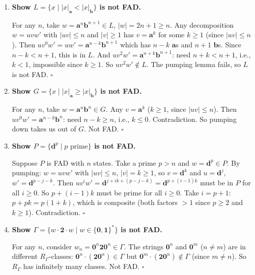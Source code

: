 \begin{enumerate}[{2.}1.]
\item \textbf{Show $L=\{x\mid|x|_\mathbf{a}<|x|_\mathbf{b}\}$ is not FAD.}

For any $n$, take $w=\mathbf{a}^n\mathbf{b}^{n+1}\in L$, $|w|=2n+1\geq n$. Any decomposition $w=uvw'$ with $|uv|\leq n$ and $|v|\geq 1$ has $v=\mathbf{a}^k$ for some $k\geq 1$ (since $|uv|\leq n$). Then $uv^0w'=uw'=\mathbf{a}^{n-k}\mathbf{b}^{n+1}$ which has $n-k$ $\mathbf{a}$s and $n+1$ $\mathbf{b}$s. Since $n-k<n+1$, this is in $L$. And $uv^2w'=\mathbf{a}^{n+k}\mathbf{b}^{n+1}$: need $n+k < n+1$, i.e., $k<1$, impossible since $k\geq 1$. So $uv^2w'\notin L$. The pumping lemma fails, so $L$ is not FAD. $\square$

\item \textbf{Show $G=\{x\mid|x|_\mathbf{a}\geq|x|_\mathbf{b}\}$ is not FAD.}

For any $n$, take $w=\mathbf{a}^n\mathbf{b}^n\in G$. Any $v=\mathbf{a}^k$ ($k\geq 1$, since $|uv|\leq n$). Then $uv^0w'=\mathbf{a}^{n-k}\mathbf{b}^n$: need $n-k\geq n$, i.e., $k\leq 0$. Contradiction. So pumping down takes us out of $G$. Not FAD. $\square$

\item \textbf{Show $P=\{\mathbf{d}^p\mid p\text{ prime}\}$ is not FAD.}

Suppose $P$ is FAD with $n$ states. Take a prime $p>n$ and $w=\mathbf{d}^p\in P$. By pumping: $w=uvw'$ with $|uv|\leq n$, $|v|=k\geq 1$, so $v=\mathbf{d}^k$ and $u=\mathbf{d}^j$, $w'=\mathbf{d}^{p-j-k}$. Then $uv^iw'=\mathbf{d}^{j+ik+(p-j-k)}=\mathbf{d}^{p+(i-1)k}$ must be in $P$ for all $i\geq 0$. So $p+(i-1)k$ must be prime for all $i\geq 0$. Take $i=p+1$: $p+pk=p(1+k)$, which is composite (both factors $>1$ since $p\geq 2$ and $k\geq 1$). Contradiction. $\square$

\item \textbf{Show $\Gamma=\{w\cdot\mathbf{2}\cdot w\mid w\in\{\mathbf{0},\mathbf{1}\}^*\}$ is not FAD.}

For any $n$, consider $w_n=\mathbf{0}^n\mathbf{2}\mathbf{0}^n\in\Gamma$. The strings $\mathbf{0}^n$ and $\mathbf{0}^m$ ($n\neq m$) are in different $R_\Gamma$-classes: $\mathbf{0}^n\cdot(\mathbf{2}\mathbf{0}^n)\in\Gamma$ but $\mathbf{0}^m\cdot(\mathbf{2}\mathbf{0}^n)\notin\Gamma$ (since $m\neq n$). So $R_\Gamma$ has infinitely many classes. Not FAD. $\square$


\end{enumerate}
